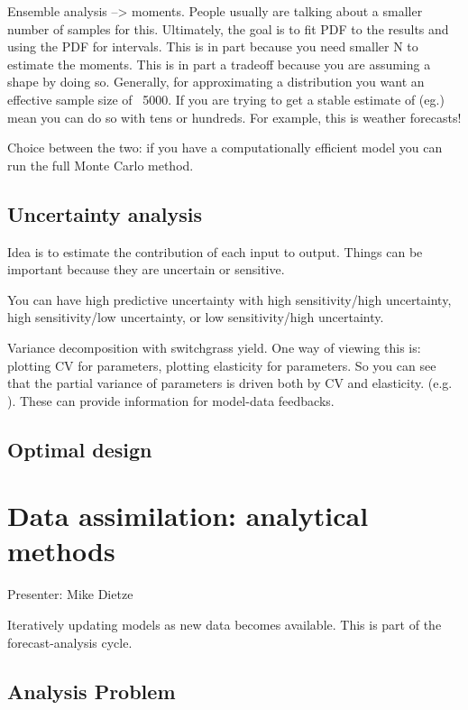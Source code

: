 \documentclass[12pt, oneside]{article}   	%
\begin{document}
Ensemble analysis --> moments. People usually are talking about a smaller number of samples for this. Ultimately, the goal is to fit PDF to the results and using the PDF for intervals. This is in part because you need smaller N to estimate the moments. This is in part a tradeoff because you are assuming a shape by doing so. Generally, for approximating a distribution you want an effective sample size of ~5000. If you are trying to get a stable estimate of (eg.) mean you can do so with tens or hundreds. For example, this is weather forecasts! 

Choice between the two: if you have a computationally efficient model you can run the full Monte Carlo method.

\subsection{Uncertainty analysis}

Idea is to estimate the contribution of each input to output. Things can be important because they are uncertain or sensitive.

You can have high predictive uncertainty with high sensitivity/high uncertainty, high sensitivity/low uncertainty, or low sensitivity/high uncertainty.

Variance decomposition with switchgrass yield. One way of viewing this is: plotting CV for parameters, plotting elasticity for parameters. So you can see that the partial variance of parameters is driven both by CV and elasticity. (e.g. \cite{raczka2018}). These can provide information for model-data feedbacks.

\subsection{Optimal design}


\section{Data assimilation: analytical methods}

Presenter: Mike Dietze

Iteratively updating models as new data becomes available. This is part of the forecast-analysis cycle.

\subsection{Analysis Problem}
\end{document}
